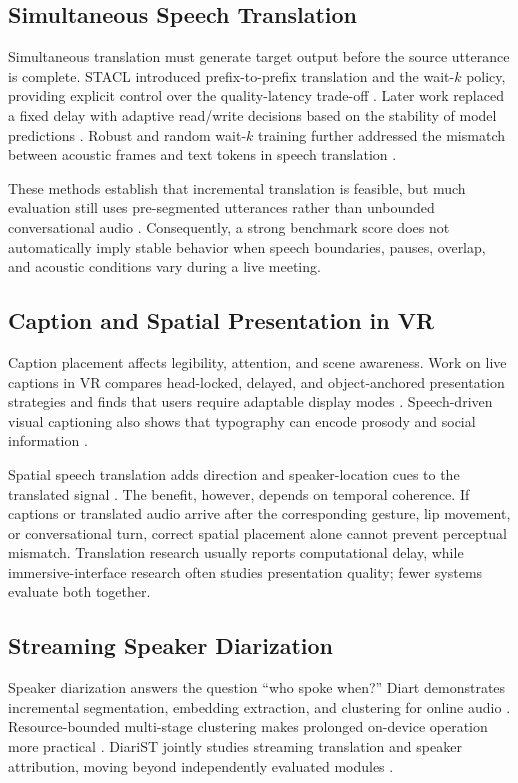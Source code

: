 \documentclass[conference]{IEEEtran}
\begin{document}
\subsection{Simultaneous Speech Translation}
Simultaneous translation must generate target output before the source utterance is complete. STACL introduced prefix-to-prefix translation and the wait-$k$ policy, providing explicit control over the quality-latency trade-off \cite{ma2019stacl}. Later work replaced a fixed delay with adaptive read/write decisions based on the stability of model predictions \cite{zhao2023adaptive,zhao2024psfuture}. Robust and random wait-$k$ training further addressed the mismatch between acoustic frames and text tokens in speech translation \cite{zhang2023robust}.

These methods establish that incremental translation is feasible, but much evaluation still uses pre-segmented utterances rather than unbounded conversational audio \cite{papi2025realtime}. Consequently, a strong benchmark score does not automatically imply stable behavior when speech boundaries, pauses, overlap, and acoustic conditions vary during a live meeting.

\subsection{Caption and Spatial Presentation in VR}
Caption placement affects legibility, attention, and scene awareness. Work on live captions in VR compares head-locked, delayed, and object-anchored presentation strategies and finds that users require adaptable display modes \cite{pidathala2022captions}. Speech-driven visual captioning also shows that typography can encode prosody and social information \cite{zhang2025speechcap}.

Spatial speech translation adds direction and speaker-location cues to the translated signal \cite{chen2025spatial}. The benefit, however, depends on temporal coherence. If captions or translated audio arrive after the corresponding gesture, lip movement, or conversational turn, correct spatial placement alone cannot prevent perceptual mismatch. Translation research usually reports computational delay, while immersive-interface research often studies presentation quality; fewer systems evaluate both together.

\subsection{Streaming Speaker Diarization}
Speaker diarization answers the question ``who spoke when?'' Diart demonstrates incremental segmentation, embedding extraction, and clustering for online audio \cite{coria2024diart}. Resource-bounded multi-stage clustering makes prolonged on-device operation more practical \cite{wang2022ondevice}. DiariST jointly studies streaming translation and speaker attribution, moving beyond independently evaluated modules \cite{masumura2023diarist}.
\end{document}
